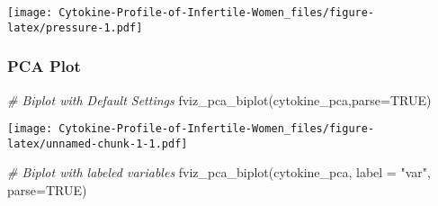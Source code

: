 \documentclass[
]{article}
\newenvironment{Shaded}{\begin{snugshade}}{\end{snugshade}}
\newcommand{\AttributeTok}[1]{\textcolor[rgb]{0.77,0.63,0.00}{#1}}
\newcommand{\CommentTok}[1]{\textcolor[rgb]{0.56,0.35,0.01}{\textit{#1}}}
\newcommand{\ConstantTok}[1]{\textcolor[rgb]{0.00,0.00,0.00}{#1}}
\newcommand{\DecValTok}[1]{\textcolor[rgb]{0.00,0.00,0.81}{#1}}
\newcommand{\FunctionTok}[1]{\textcolor[rgb]{0.00,0.00,0.00}{#1}}
\newcommand{\NormalTok}[1]{#1}
\newcommand{\OtherTok}[1]{\textcolor[rgb]{0.56,0.35,0.01}{#1}}
\newcommand{\SpecialCharTok}[1]{\textcolor[rgb]{0.00,0.00,0.00}{#1}}
\newcommand{\StringTok}[1]{\textcolor[rgb]{0.31,0.60,0.02}{#1}}
\begin{document}
\begin{Shaded}
\end{Shaded}

\texttt{[image: Cytokine-Profile-of-Infertile-Women\_files/figure-latex/pressure-1.pdf]}

\hypertarget{pca-plot}{%
\subsubsection{PCA Plot}\label{pca-plot}}

\begin{Shaded}
\begin{Highlighting}[]
\CommentTok{\# Biplot with Default Settings}
\FunctionTok{fviz\_pca\_biplot}\NormalTok{(cytokine\_pca,}\AttributeTok{parse=}\ConstantTok{TRUE}\NormalTok{)}
\end{Highlighting}
\end{Shaded}

\texttt{[image: Cytokine-Profile-of-Infertile-Women\_files/figure-latex/unnamed-chunk-1-1.pdf]}

\begin{Shaded}
\begin{Highlighting}[]
\CommentTok{\# Biplot with labeled variables}
\FunctionTok{fviz\_pca\_biplot}\NormalTok{(cytokine\_pca,}
                \AttributeTok{label =} \StringTok{"var"}\NormalTok{, }\AttributeTok{parse=}\ConstantTok{TRUE}\NormalTok{)}
\end{Highlighting}
\end{Shaded}
\end{document}
